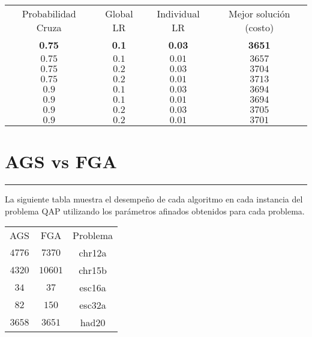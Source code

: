 \documentclass[letterpaper]{article}
\begin{document}
		\begin{center}
		\begin{tabular}[b]{| c | c | c | c |}
    		\hline
    		\rowcolor{black}
    		\multicolumn{4}{|c|}{\textcolor{white}{\textbf{Had20}}} \\
    		\hline
    		\hline
    		Probabilidad Cruza & Global LR &  Individual LR & Mejor solución (costo) \\
    		\hline
    		\textbf{0.75} & \textbf{0.1} & \textbf{0.03} &  \textbf{3651}\\
    		\hline
    		$0.75$ & $0.1$ & $0.01$ & $3657$\\
    		\hline
    		$0.75$ & $0.2$ & $0.03$ & $3704$\\
    		\hline
    		$0.75$ & $0.2$ & $0.01$ & $3713$\\
    		\hline
    		$0.9$ & $0.1$ & $0.03$ &  $3694$\\
    		\hline
    		$0.9$ & $0.1$ & $0.01$ & $3694$\\
    		\hline
    		$0.9$ & $0.2$ & $0.03$ & $3705$\\
    		\hline
    		$0.9$ & $0.2$ & $0.01$ & $3701$\\
    		\hline
    	\end{tabular}
	\end{center}

	\section{AGS vs FGA}
	\noindent\rule{\textwidth}{1pt}

	La siguiente tabla muestra el desempeño de cada algoritmo en cada instancia
	del problema QAP utilizando los parámetros afinados obtenidos para cada
	problema.

	\begin{center}
		\begin{tabular}[b]{| c | c | c |}
    		\hline
    		\rowcolor{black}
    		\multicolumn{3}{|c|}{\textcolor{white}{\textbf{FGA vs AGS}}} \\
    		\hline
    		\hline
    		AGS & FGA & Problema \\
    		\hline
    		$4776$ & $7370$ & chr12a\\
    		\hline
    		$4320$ & $10 601$ & chr15b\\
    		\hline
    		$34$ & $37$ & esc16a\\
    		\hline
    		$82$ & $150$ & esc32a\\
    		\hline
    		$3658$ & $3651$ & had20\\
    		\hline
    	\end{tabular}
	\end{center}
\end{document}

